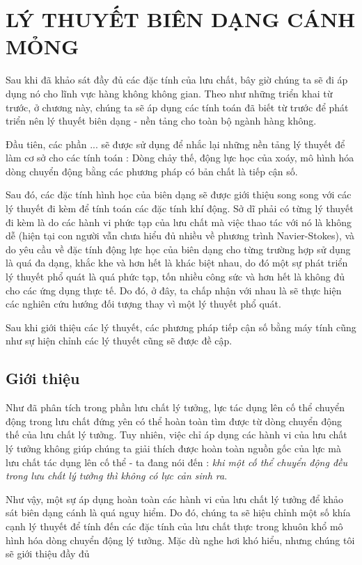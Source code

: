 \documentclass[KHI_DONG_HOC.tex]{subfiles}
\begin{document}
\chapter{LÝ THUYẾT BIÊN DẠNG CÁNH MỎNG}

	Sau khi đã khảo sát đầy đủ các đặc tính của lưu chất, bây giờ chúng ta sẽ đi áp dụng nó cho lĩnh vực hàng không không gian. Theo như những triển khai từ trước, ở chương này, chúng ta sẽ áp dụng các tính toán đã biết từ trước để phát triển nên lý thuyết biên dạng - nền tảng cho toàn bộ ngành hàng không.

	Đầu tiên, các phần ... sẽ được sử dụng để nhắc lại những nền tảng lý thuyết để làm cơ sở cho các tính toán : Dòng chảy thế, động lực học của xoáy, mô hình hóa dòng chuyển động bằng các phương pháp có bản chất là tiếp cận số.

	Sau đó, các đặc tính hình học của biên dạng sẽ được giới thiệu song song với các lý thuyết đi kèm để tính toán các đặc tính khí động. Sở dĩ phải có từng lý thuyết đi kèm là do các hành vi phức tạp của lưu chất mà việc thao tác với nó là không dễ (hiện tại con người vẫn chưa hiểu đủ nhiều về phương trình Navier-Stokes), và do yêu cầu về đặc tính động lực học của biên dạng cho từng trường hợp sử dụng là quá đa dạng, khắc khe và hơn hết là khác biệt nhau, do đó một sự phát triển lý thuyết phổ quát là quá phức tạp, tốn nhiều công sức và hơn hết là không đủ cho các ứng dụng thực tế. Do đó, ở đây, ta chấp nhận với nhau là sẽ thực hiện các nghiên cứu hướng đối tượng thay vì một lý thuyết phổ quát.

	Sau khi giới thiệu các lý thuyết, các phương pháp tiếp cận số bằng máy tính cũng như sự hiện chỉnh các lý thuyết cũng sẽ được đề cập.

\newpage

\section{Giới thiệu}

	Như đã phân tích trong phần lưu chất lý tưởng, lực tác dụng lên cố thể chuyển động trong lưu chất đứng yên có thể hoàn toàn tìm được từ dòng chuyển động thế của lưu chất lý tưởng. Tuy nhiên, việc chỉ áp dụng các hành vi của lưu chất lý tưởng không giúp chúng ta giải thích được hoàn toàn nguồn gốc của lực mà lưu chất tác dụng lên cố thể - ta đang nói đến  : \textit{khi một cố thể chuyển động đều trong lưu chất lý tưởng thì không có lực cản sinh ra}.
	
	Như vậy, một sự áp dụng hoàn toàn các hành vi của lưu chất lý tưởng để khảo sát biên dạng cánh là quá nguy hiểm. Do đó, chúng ta sẽ hiệu chỉnh một số khía cạnh lý thuyết để tính đến các đặc tính của lưu chất thực trong khuôn khổ mô hình hóa dòng chuyển động lý tưởng. Mặc dù nghe hơi khó hiểu, nhưng chúng tôi sẽ giới thiệu đầy đủ 
	
\end{document}
